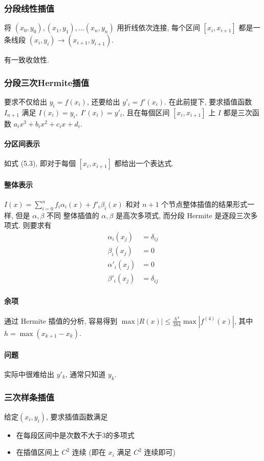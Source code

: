 \documentclass{ctexart}
\begin{document}
\subsubsection{分段线性插值}
    将 $(x_0,y_0), (x_1,y_1),\ldots (x_n,y_n)$ 用折线依次连接,
    每个区间 $[x_i,x_{i+1}]$ 都是一条线段
    $(x_i,y_i) \to (x_{i+1},y_{i+1})$.\par
    有一致收敛性.
\subsubsection{分段三次Hermite插值}
    要求不仅给出 $y_i = f(x_i)$, 还要给出 $y'_i = f'(x_i)$.
    在此前提下, 要求插值函数 $I_{n+1}$ 满足
    $I(x_i) = y_i,\;I'(x_i) = y'_i$,
    且在每個区间 $[x_i,x_{i+1}]$ 上 $I$
    都是三次函数 $a_ix^3+b_ix^2+c_ix+d_i$.
\paragraph{分区间表示}
    如式 (5.3), 即对于每個 $[x_i,x_{i+1}]$ 都给出一个表达式.
\paragraph{整体表示}
    $I(x) = \sum_{i=0}^n f_i\alpha_i(x) + f'_i\beta_i(x)$
    和对 $n+1$ 个节点整体插值的结果形式一样,
    但是 $\alpha, \beta$ 不同
    整体插值的 $\alpha, \beta$ 是高次多项式, 而分段 Hermite 是逐段三次多项式. 则要求有 \begin{align*}
        \alpha_i(x_j) &= \delta_{ij}\\
        \beta_i(x_j) &= 0\\
        \alpha'_i(x_j) &= 0\\
        \beta'_i(x_j) &= \delta_{ij}
    \end{align*}
\paragraph{余项}
    通过 Hermite 插值的分析, 容易得到
    $\max |R(x)| \le \frac{h^4}{384} \max |f^{(4)}(x)|$, 其中
    $h = \max (x_{k+1} - x_k)$.
\paragraph{问题}
    实际中很难给出 $y'_k$, 通常只知道 $y_k$.
\subsubsection{三次样条插值}
    给定$(x_i,y_i)$, 要求插值函数满足\begin{itemize}
        \item 在每段区间中是次数不大于3的多项式
        \item 在插值区间上 $C^2$ 连续 (即在 $x_i$ 满足 $C^2$ 连续即可)
    \end{itemize}
\end{document}
